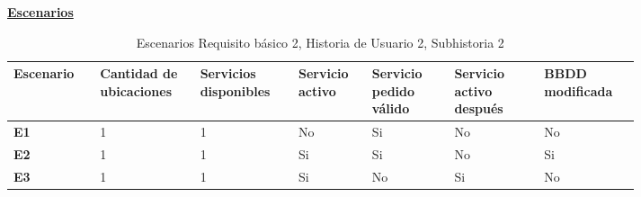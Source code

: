 \documentclass[../ei103948-project-documentation.tex]{subfiles}
\begin{document}
					\begin{center}
						\textbf{\underline{Escenarios}}
						\begin{table}[H]
							\centering
						\begin{tabular}{|p{0.11\linewidth}|p{0.13\linewidth}|p{0.13\linewidth}|p{0.09\linewidth}|p{0.11\linewidth}|p{0.12\linewidth}|p{0.12\linewidth}|}
							\hline
								\textbf{Escenario} & \textbf{Cantidad de ubicaciones} & \textbf{Servicios disponibles} & \textbf{Servicio activo} & \textbf{Servicio pedido  válido} & \textbf{Servicio activo después} & \textbf{BBDD modificada} \\ \hline
								\textbf{E1}        & 1                                & 1                              & No                       & Si                               & No                               & No                       \\ \hline
								\textbf{E2}        & 1                                & 1                              & Si                       & Si                               & No                               & Si                       \\ \hline
								\textbf{E3}        & 1                                & 1                              & Si                       & No                               & Si                               & No                       \\ \hline
								\end{tabular}
							\caption{Escenarios Requisito básico 2, Historia de Usuario 2, Subhistoria 2}
						\end{table}

						\descripcionBasicaN
	

\end{center}
\end{document}
